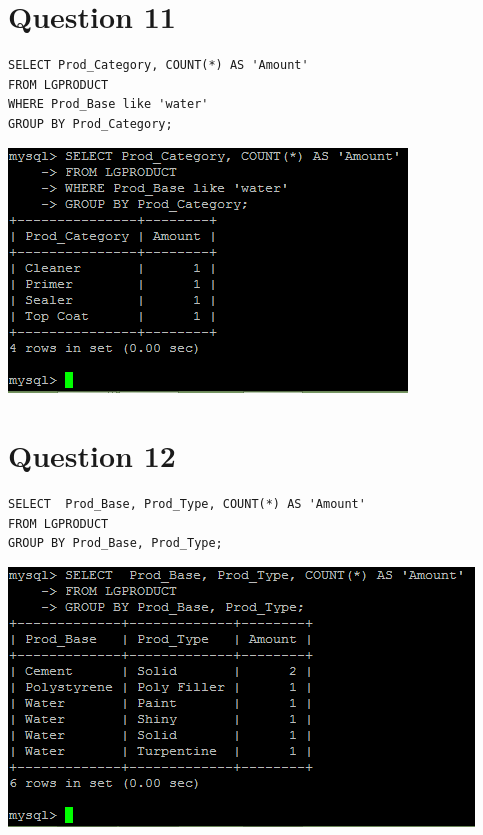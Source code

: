 \documentclass[a4paper,10pt]{article}
\begin{document}
\section {Question 11}
\lstset{
            language=SQL,
            breaklines=true
            }
        \begin{lstlisting}[frame=single]
        SELECT Prod_Category, COUNT(*) AS 'Amount'
FROM LGPRODUCT
WHERE Prod_Base like 'water'
GROUP BY Prod_Category;

        \end{lstlisting}
\includegraphics{Queries/Question_11/Question_11_screenshot.PNG}
\section {Question 12}
\lstset{
            language=SQL,
            breaklines=true
            }
        \begin{lstlisting}[frame=single]
        SELECT  Prod_Base, Prod_Type, COUNT(*) AS 'Amount'
FROM LGPRODUCT
GROUP BY Prod_Base, Prod_Type;

        \end{lstlisting}
\includegraphics{Queries/Question_12/Question_12_Screenshot.PNG}
\end{document}
